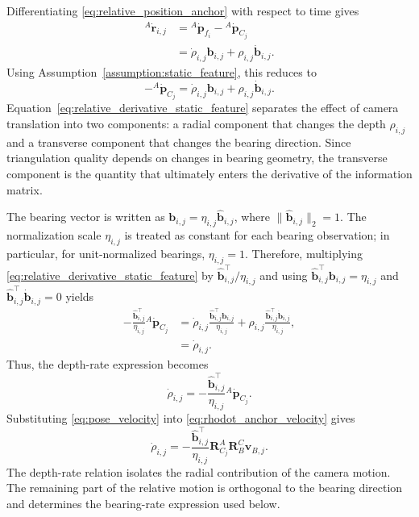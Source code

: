 \documentclass[journal]{IEEEtran}
\begin{document}
Differentiating \eqref{eq:relative_position_anchor} with respect to time gives
\begin{align}
  {}^{A}\dot{\bm{r}}_{i,j}
  &=
  {}^{A}\dot{\bm{p}}_{f_i}
  -
  {}^{A}\dot{\bm{p}}_{C_j} \nonumber\\
  &=
  \dot{\rho}_{i,j}\bm{b}_{i,j}
  +
  \rho_{i,j}\dot{\bm{b}}_{i,j}.
  \label{eq:relative_position_derivative}
\end{align}
Using Assumption~\ref{assumption:static_feature}, this reduces to
\begin{equation}
  -{}^{A}\dot{\bm{p}}_{C_j}
  =
  \dot{\rho}_{i,j}\bm{b}_{i,j}
  +
  \rho_{i,j}\dot{\bm{b}}_{i,j}.
  \label{eq:relative_derivative_static_feature}
\end{equation}
Equation~\eqref{eq:relative_derivative_static_feature} separates the effect of
camera translation into two components: a radial component that changes the
depth $\rho_{i,j}$ and a transverse component that changes the bearing
direction. Since triangulation quality depends on changes in bearing geometry,
the transverse component is the quantity that ultimately enters the derivative
of the information matrix.

The bearing vector is written as
$\bm{b}_{i,j}=\eta_{i,j}\hat{\bm{b}}_{i,j}$, where
$\|\hat{\bm{b}}_{i,j}\|_2=1$. The normalization scale $\eta_{i,j}$ is treated
as constant for each bearing observation; in particular, for unit-normalized
bearings, $\eta_{i,j}=1$. Therefore, multiplying \eqref{eq:relative_derivative_static_feature} by
$\hat{\bm{b}}_{i,j}^{\top}/\eta_{i,j}$ and using $\hat{\bm{b}}_{i,j}^{\top}\bm{b}_{i,j} = \eta_{i,j}$ and $\hat{\bm{b}}_{i,j}^{\top}\dot{\bm{b}}_{i,j} = 0$ yields
\begin{align}
  -\frac{\hat{\bm{b}}_{i,j}^{\top}}{\eta_{i,j}}
  {}^{A}\dot{\bm{p}}_{C_j}
  &=
  \dot{\rho}_{i,j}
  \frac{\hat{\bm{b}}_{i,j}^{\top}\bm{b}_{i,j}}{\eta_{i,j}}
  +
  \rho_{i,j}
  \frac{\hat{\bm{b}}_{i,j}^{\top}\dot{\bm{b}}_{i,j}}{\eta_{i,j}},
  \nonumber\\
  &=
  \dot{\rho}_{i,j}.
\end{align}
Thus, the depth-rate expression becomes
\begin{equation}
  \dot{\rho}_{i,j}
  =
  -\frac{\hat{\bm{b}}_{i,j}^{\top}}{\eta_{i,j}}
  {}^{A}\dot{\bm{p}}_{C_j}.
  \label{eq:rhodot_anchor_velocity}
\end{equation}
Substituting \eqref{eq:pose_velocity} into \eqref{eq:rhodot_anchor_velocity}
gives
\begin{equation}
  \dot{\rho}_{i,j}
  =
  -\frac{\hat{\bm{b}}_{i,j}^{\top}}{\eta_{i,j}}
  \bm{R}_{C_j}^{A}\bm{R}_{B}^{C}\bm{v}_{B,j}.
  \label{eq:rhodot_multi_feature}
\end{equation}
The depth-rate relation isolates the radial contribution of the camera motion.
The remaining part of the relative motion is orthogonal to the bearing
direction and determines the bearing-rate expression used below.
\end{document}
